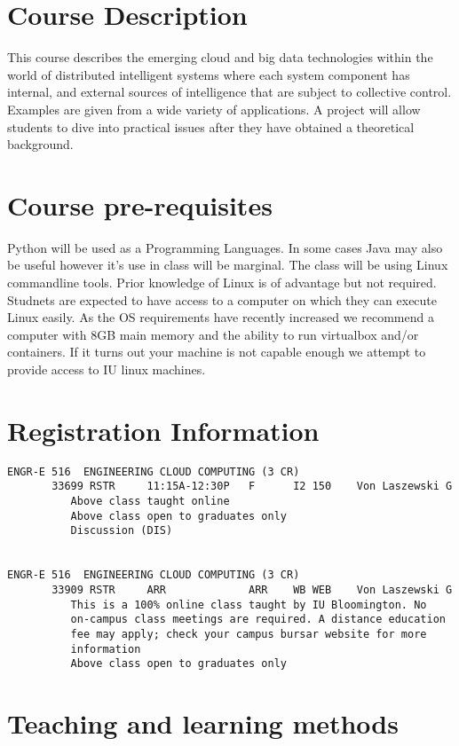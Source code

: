 \section{Course Description}

This course describes the emerging cloud and big data technologies
within the world of distributed intelligent systems where each system
component has internal, and external sources of intelligence that are
subject to collective control. Examples are given from a wide variety
of applications. A project will allow students to dive into practical
issues after they have obtained a theoretical background.

\section{Course pre-requisites}

Python will be used as a Programming Languages. In some cases Java may
also be useful however it's use in class will be marginal. The class
will be using Linux commandline tools. Prior knowledge of Linux is of
advantage but not required.  Studnets are expected to have access to a
computer on which they can execute Linux easily. As the OS
requirements have recently increased we recommend a computer with 8GB
main memory and the ability to run virtualbox and/or containers. If it
turns out your machine is not capable enough we attempt to provide
access to IU linux machines.

\section{Registration Information}

\begin{verbatim}
ENGR-E 516  ENGINEERING CLOUD COMPUTING (3 CR)
       33699 RSTR     11:15A-12:30P   F      I2 150    Von Laszewski G
          Above class taught online
          Above class open to graduates only
          Discussion (DIS)


ENGR-E 516  ENGINEERING CLOUD COMPUTING (3 CR)
       33909 RSTR     ARR             ARR    WB WEB    Von Laszewski G
          This is a 100% online class taught by IU Bloomington. No
          on-campus class meetings are required. A distance education
          fee may apply; check your campus bursar website for more
          information
          Above class open to graduates only
\end{verbatim}


\section{Teaching and learning methods}



